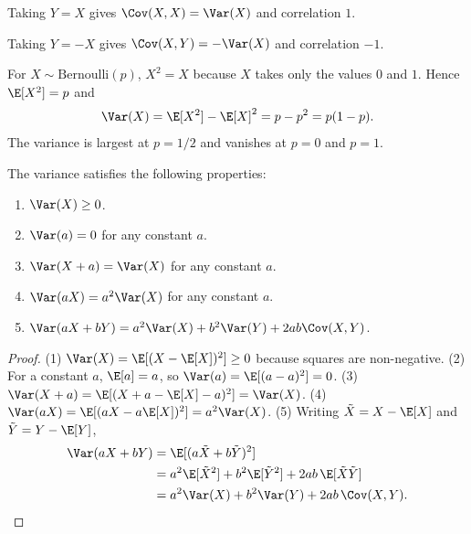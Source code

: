 \documentclass[a4paper, 12pt]{book}
\begin{document}
\begin{example}
    Taking $Y=X$ gives $\Cov(X,X)=\Var(X)$ and correlation $1$.
\end{example}

\begin{example}
    Taking $Y=-X$ gives $\Cov(X,Y)=-\Var(X)$ and correlation $-1$.
\end{example}

\begin{example}
    For $X\sim\mathrm{Bernoulli}(p)$, $X^2=X$ because $X$ takes only the values
    $0$ and $1$. Hence $\E[X^2]=p$ and
    \begin{align}
        \Var(X) = \E[X^2]-\E[X]^2 = p-p^2 = p(1-p).
    \end{align}
    The variance is largest at $p=1/2$ and vanishes at $p=0$ and $p=1$.
\end{example}

\begin{proposition}
    The variance satisfies the following properties:
    \begin{enumerate}
        \item $\Var(X) \geq 0$.
        \item $\Var(a) = 0$ for any constant $a$.
        \item $\Var(X + a) = \Var(X)$ for any constant $a$.
        \item $\Var(aX) = a^2\Var(X)$ for any constant $a$.
        \item $\Var(aX+bY) = a^2\Var(X)+b^2\Var(Y)+2ab\Cov(X,Y)$.
    \end{enumerate}
\end{proposition}
\begin{proof}
    (1) $\Var(X)=\E[(X-\E[X])^2]\geq0$ because squares are non-negative.
    (2) For a constant $a$, $\E[a]=a$, so $\Var(a)=\E[(a-a)^2]=0$.
    (3) $\Var(X+a)=\E[(X+a-\E[X]-a)^2]=\Var(X)$.
    (4) $\Var(aX)=\E[(aX-a\E[X])^2]=a^2\Var(X)$.
    (5) Writing $\tilde X=X-\E[X]$ and $\tilde Y=Y-\E[Y]$,
    \begin{align}
        \Var(aX+bY)&=\E[(a\tilde X+b\tilde Y)^2]\\
        &=a^2\E[\tilde X^2]+b^2\E[\tilde Y^2]+2ab\,\E[\tilde X\tilde Y]\\
        &=a^2\Var(X)+b^2\Var(Y)+2ab\,\Cov(X,Y).\qedhere
    \end{align}
\end{proof}
\end{document}
